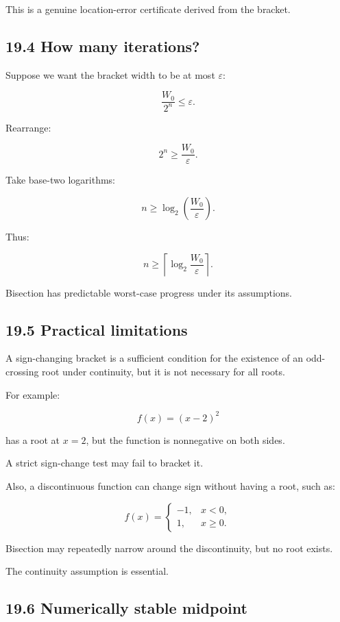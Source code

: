 This is a genuine location-error certificate derived from the bracket.

\subsection{19.4 How many iterations?}\label{02-foundations-ii-ch028-how-many-iterations}

Suppose we want the bracket width to be at most \(\varepsilon\):

\[ \frac{W_0}{2^n}\le\varepsilon. \]

Rearrange:

\[ 2^n\ge\frac{W_0}{\varepsilon}. \]

Take base-two logarithms:

\[ n\ge \log_2\left(\frac{W_0}{\varepsilon}\right). \]

Thus:

\[ \boxed{ n\ge \left\lceil \log_2\frac{W_0}{\varepsilon} \right\rceil }. \]

Bisection has predictable worst-case progress under its assumptions.

\subsection{19.5 Practical limitations}\label{02-foundations-ii-ch028-practical-limitations}

A sign-changing bracket is a sufficient condition for the existence of an odd-crossing root under continuity, but it is not necessary for all roots.

For example:

\[ f(x)=(x-2)^2 \]

has a root at \(x=2\), but the function is nonnegative on both sides.

A strict sign-change test may fail to bracket it.

Also, a discontinuous function can change sign without having a root, such as:

\[ f(x)= \begin{cases} -1,&x<0,\\ 1,&x\ge0. \end{cases} \]

Bisection may repeatedly narrow around the discontinuity, but no root exists.

The continuity assumption is essential.

\subsection{19.6 Numerically stable midpoint}\label{02-foundations-ii-ch028-numerically-stable-midpoint}


